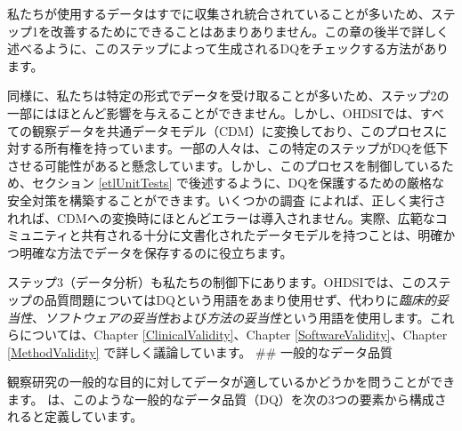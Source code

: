 \documentclass[
  11pt]{book}
\theoremstyle{definition}
\theoremstyle{definition}
\theoremstyle{definition}
\theoremstyle{definition}
\theoremstyle{remark}
\begin{document}
私たちが使用するデータはすでに収集され統合されていることが多いため、ステップ1を改善するためにできることはあまりありません。この章の後半で詳しく述べるように、このステップによって生成されるDQをチェックする方法があります。

同様に、私たちは特定の形式でデータを受け取ることが多いため、ステップ2の一部にはほとんど影響を与えることができません。しかし、OHDSIでは、すべての観察データを共通データモデル（CDM）に変換しており、このプロセスに対する所有権を持っています。一部の人々は、この特定のステップがDQを低下させる可能性があると懸念しています。しかし、このプロセスを制御しているため、セクション \ref{etlUnitTests} で後述するように、DQを保護するための厳格な安全対策を構築することができます。いくつかの調査 \citep{defalco_2013, makadia_2014, matcho_2014, voss_2015, voss_2015b, hripcsak_2018} によれば、正しく実行されれば、CDMへの変換時にほとんどエラーは導入されません。実際、広範なコミュニティと共有される十分に文書化されたデータモデルを持つことは、明確かつ明確な方法でデータを保存するのに役立ちます。

ステップ3（データ分析）も私たちの制御下にあります。OHDSIでは、このステップの品質問題についてはDQという用語をあまり使用せず、代わりに\emph{臨床的妥当性}、\emph{ソフトウェアの妥当性}および\emph{方法の妥当性}という用語を使用します。これらについては、Chapter \ref{ClinicalValidity}、Chapter \ref{SoftwareValidity}、Chapter \ref{MethodValidity} で詳しく議論しています。
\#\# 一般的なデータ品質

観察研究の一般的な目的に対してデータが適しているかどうかを問うことができます。\citet{kahn_harmonized_2016} は、このような一般的なデータ品質（DQ）を次の3つの要素から構成されると定義しています。
\end{document}
